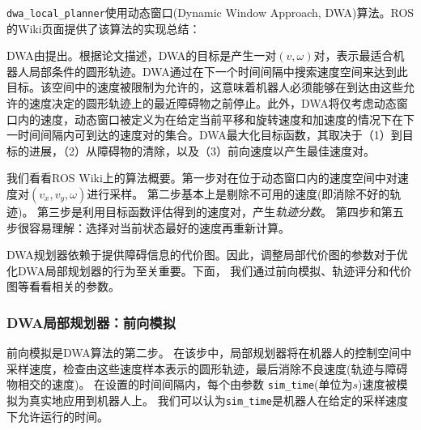 \texttt{dwa_local_planner}使用动态窗口(Dynamic Window Approach, DWA)算法。ROS的Wiki页面提供了该算法的实现总结：

\begin{center}
	\setlength{\fboxsep}{1em}
\end{center}

DWA由\cite{fox1997dynamic}提出。根据论文描述，DWA的目标是产生一对$(v,\omega)$对，表示最适合机器人局部条件的圆形轨迹。DWA通过在下一个时间间隔中搜索速度空间来达到此目标。该空间中的速度被限制为允许的，这意味着机器人必须能够在到达由这些允许的速度决定的圆形轨迹上的最近障碍物之前停止。此外，DWA将仅考虑动态窗口内的速度，动态窗口被定义为在给定当前平移和旋转速度和加速度的情况下在下一时间间隔内可到达的速度对的集合。DWA最大化目标函数，其取决于（1）到目标的进展，（2）从障碍物的清除，以及（3）前向速度以产生最佳速度对。

我们看看ROS Wiki上的算法概要。第一步对在位于动态窗口内的速度空间中对速度对$(v_x, v_y, \omega)$进行采样。
第二步基本上是剔除不可用的速度(即消除不好的轨迹)。
第三步是利用目标函数评估得到的速度对，产生\emph{轨迹分数}。
第四步和第五步很容易理解：选择对当前状态最好的速度再重新计算。

DWA规划器依赖于提供障碍信息的代价图。因此，调整局部代价图的参数对于优化DWA局部规划器的行为至关重要。下面，
我们通过前向模拟、轨迹评分和代价图等看看相关的参数。


\subsubsection[DWA Local Planner : Forward Simulation]{DWA局部规划器：前向模拟}
前向模拟是DWA算法的第二步。
在该步中，局部规划器将在机器人的控制空间中采样速度，检查由这些速度样本表示的圆形轨迹，最后消除不良速度(轨迹与障碍物相交的速度)。
在设置的时间间隔内，每个由参数 \texttt{sim_time}(单位为$s$)速度被模拟为真实地应用到机器人上。
我们可以认为\texttt{sim_time}是机器人在给定的采样速度下允许运行的时间。

